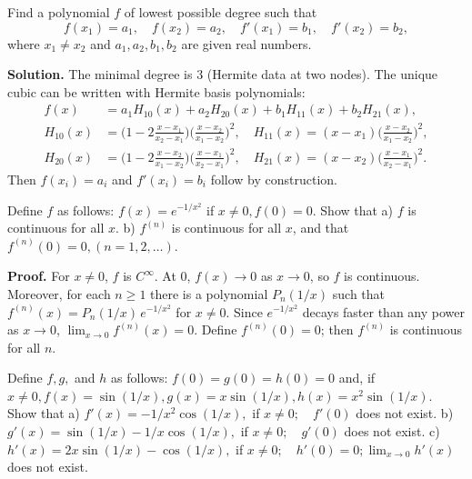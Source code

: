 \begin{problembox}
Find a polynomial \( f \) of lowest possible degree such that
\[ f(x_1) = a_1, \quad f(x_2) = a_2, \quad f'(x_1) = b_1, \quad f'(x_2) = b_2, \]
where \( x_1 \neq x_2 \) and \( a_1, a_2, b_1, b_2 \) are given real numbers.
\end{problembox}

\noindent\textbf{Solution.}
The minimal degree is \textbf{$3$} (Hermite data at two nodes). The unique cubic can be written with Hermite basis polynomials:
\[\begin{aligned}
f(x)&=a_1 H_{10}(x)+a_2 H_{20}(x)+b_1 H_{11}(x)+b_2 H_{21}(x),\\
H_{10}(x)&=\Big(1-2\frac{x-x_1}{x_2-x_1}\Big)\Big(\frac{x-x_2}{x_1-x_2}\Big)^2,\quad H_{11}(x)=(x-x_1)\Big(\frac{x-x_2}{x_1-x_2}\Big)^2,\\
H_{20}(x)&=\Big(1-2\frac{x-x_2}{x_1-x_2}\Big)\Big(\frac{x-x_1}{x_2-x_1}\Big)^2,\quad H_{21}(x)=(x-x_2)\Big(\frac{x-x_1}{x_2-x_1}\Big)^2.
\end{aligned}\]
Then $f(x_i)=a_i$ and $f'(x_i)=b_i$ follow by construction.

\begin{problembox}
Define \( f \) as follows: \( f(x) = e^{-1/x^2} \) if \( x \neq 0, f(0) = 0 \). Show that
a) \( f \) is continuous for all \( x \).
b) \( f^{(n)} \) is continuous for all \( x \), and that \( f^{(n)}(0) = 0, (n = 1, 2, \ldots ) \).
\end{problembox}

\noindent\textbf{Proof.}
For $x\ne 0$, $f$ is $C^{\infty}$. At $0$, $f(x)\to 0$ as $x\to 0$, so $f$ is continuous. Moreover, for each $n\ge 1$ there is a polynomial $P_n(1/x)$ such that $f^{(n)}(x)=P_n(1/x)\,e^{-1/x^2}$ for $x\ne 0$. Since $e^{-1/x^2}$ decays faster than any power as $x\to 0$, $\lim_{x\to 0}f^{(n)}(x)=0$. Define $f^{(n)}(0)=0$; then $f^{(n)}$ is continuous for all $n$.

\begin{problembox}
Define \( f, g, \) and \( h \) as follows: \( f(0) = g(0) = h(0) = 0 \) and, if \( x \neq 0, f(x) = \sin (1/x), g(x) = x \sin (1/x), h(x) = x^2 \sin (1/x) \). Show that
a) \( f'(x) = -1/x^2 \cos (1/x), \) if \( x \neq 0; \quad f'(0) \) does not exist.
b) \( g'(x) = \sin (1/x) - 1/x \cos (1/x), \) if \( x \neq 0; \quad g'(0) \) does not exist.
c) \( h'(x) = 2x \sin (1/x) - \cos (1/x), \) if \( x \neq 0; \quad h'(0) = 0; \lim_{x \to 0} h'(x) \) does not exist.
\end{problembox}

